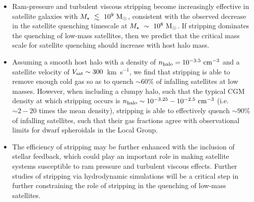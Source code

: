 \documentclass[usenatbib]{mn2e}
\newcommand{\mstar}{{M}_{\star}}
\newcommand{\msun}{{\rm M}_{\odot}}
\begin{document}
\begin{itemize}[leftmargin=0.25cm]

\item Ram-pressure and turbulent viscous stripping become increasingly
  effective in satellite galaxies with $\mstar~\lesssim~10^{9}~\msun$,
  consistent with the observed decrease in the satellite quenching
  timescale at $\mstar~\sim~10^{8}~\msun$. If stripping dominates the
  quenching of low-mass satellites, then we predict that the critical
  mass scale
  for satellite quenching should increase with host halo mass.  \\

\item Assuming a smooth host halo with a density of $n_{\rm halo} =
  10^{-3.5}~{\rm cm}^{-3}$ and a satellite velocity of $V_{\rm sat}
  \sim 300$~km~s$^{-1}$, we find that stripping is able to remove
  enough cold gas so as to quench $\sim60\%$ of infalling satellites
  at low masses.
%
  However, when including a clumpy halo, such that the typical CGM
  density at which stripping occurs is $n_{\rm halo} \sim 10^{-3.25} -
  10^{-2.5}~{\rm cm}^{-3}$ (i.e.~$\sim2-20$ times the mean density),
  stripping is able to effectively quench $\sim90\%$ of infalling
  satellites, such that their gas fractions agree with observational
  limits for dwarf spheroidals in the Local Group. \\

\item The efficiency of stripping may be further enhanced with the
  inclusion of stellar feedback, which could play an important role in
  making satellite systems susceptible to ram pressure and turbulent
  viscous effects. Further studies of stripping via hydrodynamic
  simulations will be a critical step in further constraining the role
  of stripping in the quenching of low-mass satellites.


\end{itemize}
\end{document}
